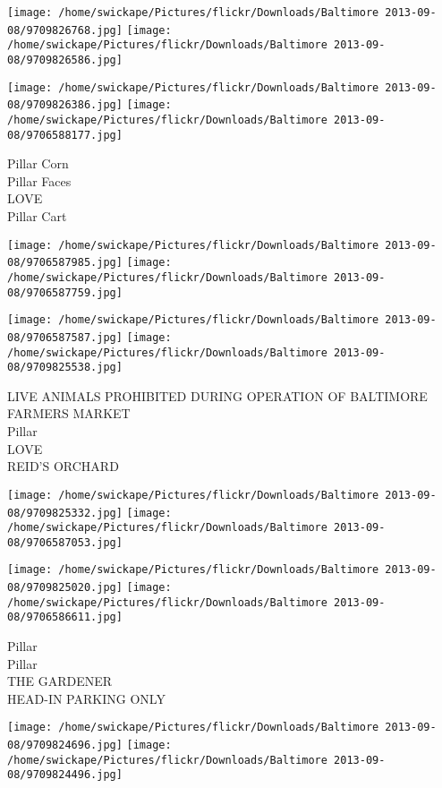 \documentclass[10pt,letterpaper]{article}
\begin{document}
\texttt{[image: /home/swickape/Pictures/flickr/Downloads/Baltimore 2013-09-08/9709826768.jpg]}
\texttt{[image: /home/swickape/Pictures/flickr/Downloads/Baltimore 2013-09-08/9709826586.jpg]}

\texttt{[image: /home/swickape/Pictures/flickr/Downloads/Baltimore 2013-09-08/9709826386.jpg]}
\texttt{[image: /home/swickape/Pictures/flickr/Downloads/Baltimore 2013-09-08/9706588177.jpg]}

Pillar Corn\\
Pillar Faces\\
LOVE\\
Pillar Cart\\
\pagebreak

\texttt{[image: /home/swickape/Pictures/flickr/Downloads/Baltimore 2013-09-08/9706587985.jpg]}
\texttt{[image: /home/swickape/Pictures/flickr/Downloads/Baltimore 2013-09-08/9706587759.jpg]}

\texttt{[image: /home/swickape/Pictures/flickr/Downloads/Baltimore 2013-09-08/9706587587.jpg]}
\texttt{[image: /home/swickape/Pictures/flickr/Downloads/Baltimore 2013-09-08/9709825538.jpg]}

LIVE ANIMALS PROHIBITED DURING OPERATION OF BALTIMORE FARMERS MARKET\\
Pillar\\
LOVE\\
REID'S ORCHARD\\
\pagebreak

\texttt{[image: /home/swickape/Pictures/flickr/Downloads/Baltimore 2013-09-08/9709825332.jpg]}
\texttt{[image: /home/swickape/Pictures/flickr/Downloads/Baltimore 2013-09-08/9706587053.jpg]}

\texttt{[image: /home/swickape/Pictures/flickr/Downloads/Baltimore 2013-09-08/9709825020.jpg]}
\texttt{[image: /home/swickape/Pictures/flickr/Downloads/Baltimore 2013-09-08/9706586611.jpg]}

Pillar\\
Pillar\\
THE GARDENER\\
HEAD{-}IN PARKING ONLY\\
\pagebreak

\texttt{[image: /home/swickape/Pictures/flickr/Downloads/Baltimore 2013-09-08/9709824696.jpg]}
\texttt{[image: /home/swickape/Pictures/flickr/Downloads/Baltimore 2013-09-08/9709824496.jpg]}
\end{document}
